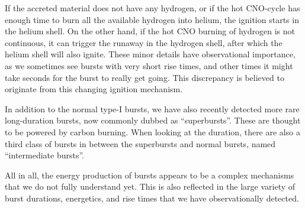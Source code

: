 If the accreted material does not have any hydrogen, or if the hot CNO-cycle has enough time to burn all the available hydrogen into helium, the ignition starts in the helium shell.
On the other hand, if the hot CNO burning of hydrogen is not continuous, it can trigger the runaway in the hydrogen shell, after which the helium shell will also ignite.
These minor details have observational importance, as we sometimes see bursts with very short rise times, and other times it might take seconds for the burst to really get going.%
This discrepancy is believed to originate from this changing ignition mechanism.

In addition to the normal type-I bursts, we have also recently detected more rare long-duration bursts, now commonly dubbed as ``superbursts''.\cite{CHK00, Kuulkers02, SB02}
These are thought to be powered by carbon burning.\cite{Cumming01}
When looking at the duration, there are also a third class of bursts in between the superbursts and normal bursts, named ``intermediate bursts''.\cite{Cumming06}

All in all, the energy production of bursts appears to be a complex mechanisms that we do not fully understand yet.
This is also reflected in the large variety of burst durations, energetics, and rise times that we have observationally detected.\cite{GMH08}
